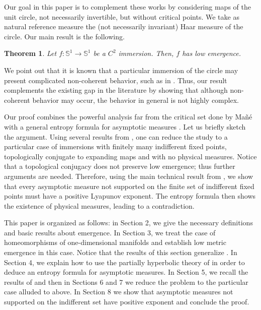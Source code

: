 \documentclass[12pt,a4paper,twoside]{article}
\theoremstyle{plain}
\newtheorem{maintheorem}{Theorem}
\theoremstyle{definition}
\begin{document}
Our goal in this paper is to complement these works by considering maps of the unit circle, not necessarily invertible, but without critical points. We take as natural reference measure the (not necessarily invariant) Haar measure of the circle. Our main result is the following.


\begin{maintheorem}
    \label{main}
Let $f:\mathbb{S}^1\to\mathbb{S}^1$ be a $C^2$ immersion. Then, $f$ has low emergence.
\end{maintheorem}


We point out that it is known that a particular immersion of the circle may present complicated non-coherent behavior, such as in \cite{Zweimuller2002ExactCovering}. Thus, our result complements the existing gap in the literature by showing that although non-coherent behavior may occur, the behavior in general is not highly complex.

Our proof combines the powerful analysis far from the critical set done by Mañé \cite{mane} with a general entropy formula for asymptotic measures \cite{CYZ}. Let us briefly sketch the argument. Using several results from \cite{mane}, one can reduce the study to a particular case of immersions with finitely many indifferent fixed points, topologically conjugate to expanding maps and with no physical measures. Notice that a topological conjugacy does not preserve low emergence; thus further arguments are needed. Therefore, using the main technical result from \cite{mane}, we show that every asymptotic measure not supported on the finite set of indifferent fixed points must have a positive Lyapunov exponent. The entropy formula \cite{CYZ} then shows the existence of physical measures, leading to a contradiction.   

This paper is organized as follows: in Section 2, we give the necessary definitions and basic results about emergence. In Section 3, we treat the case of homeomorphisms of one-dimensional manifolds and establish low metric emergence in this case. Notice that the results of this section generalize \cite{CarvalhoRodriguesVarandas2024Emergence}. In Section 4, we explain how to use the partially hyperbolic theory of \cite{CYZ} in order to deduce an entropy formula for asymptotic measures. In Section 5, we recall the results of \cite{mane} and then in Sections 6 and 7 we reduce the problem to the particular case alluded to above. In Section 8 we show that asymptotic measures not supported on the indifferent set have positive exponent and conclude the proof. 
\end{document}
